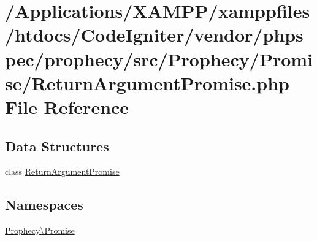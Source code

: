 \hypertarget{_return_argument_promise_8php}{}\section{/\+Applications/\+X\+A\+M\+P\+P/xamppfiles/htdocs/\+Code\+Igniter/vendor/phpspec/prophecy/src/\+Prophecy/\+Promise/\+Return\+Argument\+Promise.php File Reference}
\label{_return_argument_promise_8php}
\subsection*{Data Structures}
\begin{DoxyCompactItemize}
\item 
class \mbox{\hyperlink{class_prophecy_1_1_promise_1_1_return_argument_promise}{Return\+Argument\+Promise}}
\end{DoxyCompactItemize}
\subsection*{Namespaces}
\begin{DoxyCompactItemize}
\item 
 \mbox{\hyperlink{namespace_prophecy_1_1_promise}{Prophecy\textbackslash{}\+Promise}}
\end{DoxyCompactItemize}
